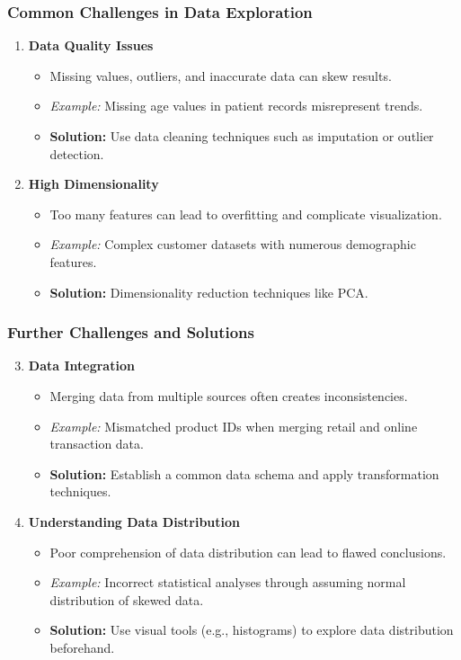 \documentclass[aspectratio=169]{beamer}
\begin{document}
\begin{frame}
    \frametitle{Common Challenges in Data Exploration}
    \begin{enumerate}
        \item \textbf{Data Quality Issues}
            \begin{itemize}
                \item Missing values, outliers, and inaccurate data can skew results.
                \item \textit{Example:} Missing age values in patient records misrepresent trends.
                \item \textbf{Solution:} Use data cleaning techniques such as imputation or outlier detection.
            \end{itemize}

        \item \textbf{High Dimensionality}
            \begin{itemize}
                \item Too many features can lead to overfitting and complicate visualization.
                \item \textit{Example:} Complex customer datasets with numerous demographic features.
                \item \textbf{Solution:} Dimensionality reduction techniques like PCA.
            \end{itemize}
    \end{enumerate}
\end{frame}

\begin{frame}
    \frametitle{Further Challenges and Solutions}
    \begin{enumerate}
        \setcounter{enumi}{2}
        \item \textbf{Data Integration}
            \begin{itemize}
                \item Merging data from multiple sources often creates inconsistencies.
                \item \textit{Example:} Mismatched product IDs when merging retail and online transaction data.
                \item \textbf{Solution:} Establish a common data schema and apply transformation techniques.
            \end{itemize}

        \item \textbf{Understanding Data Distribution}
            \begin{itemize}
                \item Poor comprehension of data distribution can lead to flawed conclusions.
                \item \textit{Example:} Incorrect statistical analyses through assuming normal distribution of skewed data.
                \item \textbf{Solution:} Use visual tools (e.g., histograms) to explore data distribution beforehand.
            \end{itemize}
    \end{enumerate}
\end{frame}
\end{document}
